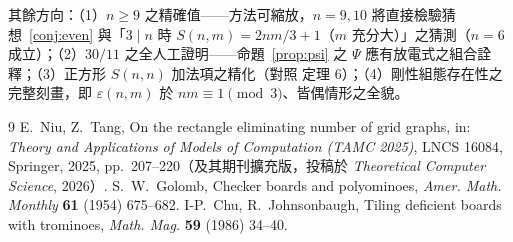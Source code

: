 \documentclass[11pt]{ctexart}
\theoremstyle{definition}
\begin{document}
其餘方向：（1）$n\ge9$ 之精確值——方法可縮放，$n=9,10$ 將直接檢驗猜想~\ref{conj:even} 與「$3\mid n$ 時 $S(n,m)=2nm/3+1$（$m$ 充分大）」之猜測（$n=6$ 成立）；（2）$30/11$ 之全人工證明——命題~\ref{prop:psi} 之 $\Psi$ 應有放電式之組合詮釋；（3）正方形 $S(n,n)$ 加法項之精化（對照 \cite{NT25} 定理 6）；（4）剛性組態存在性之完整刻畫，即 $\varepsilon(n,m)$ 於 $nm\equiv1\pmod3$、皆偶情形之全貌。

\begin{thebibliography}{9}
 E.~Niu, Z.~Tang, On the rectangle eliminating number of grid graphs, in: \emph{Theory and Applications of Models of Computation (TAMC 2025)}, LNCS 16084, Springer, 2025, pp.~207--220（及其期刊擴充版，投稿於 \emph{Theoretical Computer Science}, 2026）.
 S.~W.~Golomb, Checker boards and polyominoes, \emph{Amer. Math. Monthly} \textbf{61} (1954) 675--682.
 I-P.~Chu, R.~Johnsonbaugh, Tiling deficient boards with trominoes, \emph{Math. Mag.} \textbf{59} (1986) 34--40.
\end{thebibliography}
\end{document}
